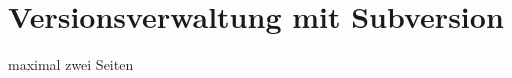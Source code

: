 \section{Versionsverwaltung mit Subversion} \label{sec:impl-Versionsverwaltung}

maximal zwei Seiten
		







\label{sec:impl-Versionsverwaltung-ende}